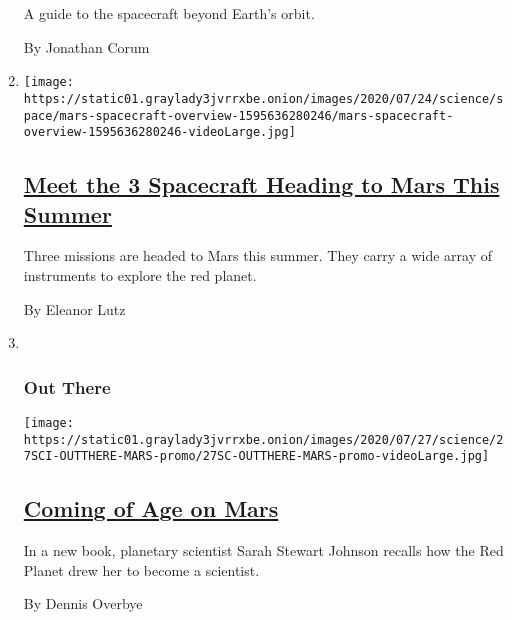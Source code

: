 \begin{enumerate}
  A guide to the spacecraft beyond Earth's orbit.

  By Jonathan Corum
\item
  \texttt{[image: https://static01.graylady3jvrrxbe.onion/images/2020/07/24/science/space/mars-spacecraft-overview-1595636280246/mars-spacecraft-overview-1595636280246-videoLarge.jpg]}

  \hypertarget{meet-the-3-spacecraft-heading-to-mars-this-summer}{%
  \subsection{\texorpdfstring{\href{/interactive/2020/science/mars-perseverance-tianwen-hope.html}{Meet
  the 3 Spacecraft Heading to Mars This
  Summer}}{Meet the 3 Spacecraft Heading to Mars This Summer}}\label{meet-the-3-spacecraft-heading-to-mars-this-summer}}

  Three missions are headed to Mars this summer. They carry a wide array
  of instruments to explore the red planet.

  By Eleanor Lutz
\item ~
  \hypertarget{out-there}{%
  \subsubsection{Out There}\label{out-there}}

  \texttt{[image: https://static01.graylady3jvrrxbe.onion/images/2020/07/27/science/27SCI-OUTTHERE-MARS-promo/27SC-OUTTHERE-MARS-promo-videoLarge.jpg]}

  \hypertarget{coming-of-age-on-mars}{%
  \subsection{\texorpdfstring{\href{/2020/07/27/science/mars-sarah-stewart-johnson.html}{Coming
  of Age on Mars}}{Coming of Age on Mars}}\label{coming-of-age-on-mars}}

  In a new book, planetary scientist Sarah Stewart Johnson recalls how
  the Red Planet drew her to become a scientist.

  By Dennis Overbye
\end{enumerate}

